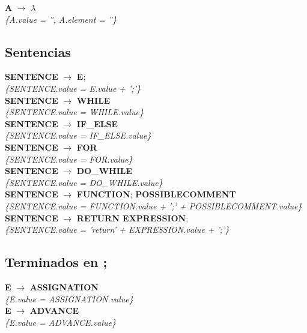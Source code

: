 \documentclass[10pt,a4paper]{article}
\begin{document}
\textbf{A} $\rightarrow$ $\lambda$ \\
\textit{\{A.value = '', A.element = ''\}} \\

\subsection{Sentencias}
\textbf{SENTENCE} $\rightarrow$ \textbf{E};\\ 
\textit{\{SENTENCE.value = E.value + ';'\}} \\

\textbf{SENTENCE} $\rightarrow$ \textbf{WHILE} \\ 
\textit{\{SENTENCE.value = WHILE.value\}} \\

\textbf{SENTENCE} $\rightarrow$ \textbf{IF\_ELSE}  \\ 
\textit{\{SENTENCE.value = IF\_ELSE.value\}} \\

\textbf{SENTENCE} $\rightarrow$ \textbf{FOR} \\ 
\textit{\{SENTENCE.value = FOR.value\}} \\

\textbf{SENTENCE} $\rightarrow$ \textbf{DO\_WHILE} \\ 
\textit{\{SENTENCE.value = DO\_WHILE.value\}}  \\

\textbf{SENTENCE} $\rightarrow$ \textbf{FUNCTION}; \textbf{POSSIBLECOMMENT} \\
\textit{\{SENTENCE.value = FUNCTION.value + ';' + POSSIBLECOMMENT.value\}} \\

\textbf{SENTENCE} $\rightarrow$ \textbf{RETURN EXPRESSION}; \\ 
\textit{\{SENTENCE.value = 'return' + EXPRESSION.value + ';'\}}  \\

\subsection{Terminados en ;}

\textbf{E} $\rightarrow$ \textbf{ASSIGNATION}\\
\textit{\{E.value = ASSIGNATION.value\}}\\

\textbf{E} $\rightarrow$ \textbf{ADVANCE}\\
\textit{\{E.value = ADVANCE.value\}}\\
\end{document}
